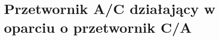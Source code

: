 \section{Przetwornik A/C działający w oparciu o przetwornik C/A}
\subsection{}
\subsection{}
\subsection{}
\subsection{}
\subsection{}
\subsection{}